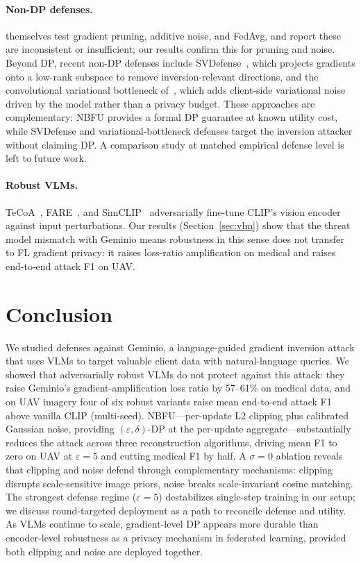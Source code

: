 \documentclass[11pt]{article}
\begin{document}
\paragraph{Non-DP defenses.}
\citet{geminio2024} themselves test gradient pruning, additive noise, and FedAvg, and report these are inconsistent or insufficient; our results confirm this for pruning and noise. Beyond DP, recent non-DP defenses include SVDefense~\citep{svdefense2025}, which projects gradients onto a low-rank subspace to remove inversion-relevant directions, and the convolutional variational bottleneck of~\citet{cvb2023}, which adds client-side variational noise driven by the model rather than a privacy budget. These approaches are complementary: NBFU provides a formal DP guarantee at known utility cost, while SVDefense and variational-bottleneck defenses target the inversion attacker without claiming DP. A comparison study at matched empirical defense level is left to future work.

\paragraph{Robust VLMs.}
TeCoA~\citep{tecoa2023}, FARE~\citep{fare2024}, and SimCLIP~\citep{simclip2024} adversarially fine-tune CLIP's vision encoder against input perturbations. Our results (Section~\ref{sec:vlm}) show that the threat model mismatch with Geminio means robustness in this sense does not transfer to FL gradient privacy: it raises loss-ratio amplification on medical and raises end-to-end attack F1 on UAV.


\section{Conclusion}

We studied defenses against Geminio, a language-guided gradient inversion attack that uses VLMs to target valuable client data with natural-language queries. We showed that adversarially robust VLMs do not protect against this attack: they raise Geminio's gradient-amplification loss ratio by 57--61\% on medical data, and on UAV imagery four of six robust variants raise mean end-to-end attack F1 above vanilla CLIP (multi-seed). NBFU---per-update L2 clipping plus calibrated Gaussian noise, providing $(\varepsilon,\delta)$-DP at the per-update aggregate---substantially reduces the attack across three reconstruction algorithms, driving mean F1 to zero on UAV at $\varepsilon{=}5$ and cutting medical F1 by half. A $\sigma{=}0$ ablation reveals that clipping and noise defend through complementary mechanisms: clipping disrupts scale-sensitive image priors, noise breaks scale-invariant cosine matching. The strongest defense regime ($\varepsilon{=}5$) destabilizes single-step training in our setup; we discuss round-targeted deployment as a path to reconcile defense and utility. As VLMs continue to scale, gradient-level DP appears more durable than encoder-level robustness as a privacy mechanism in federated learning, provided both clipping and noise are deployed together.
\end{document}
